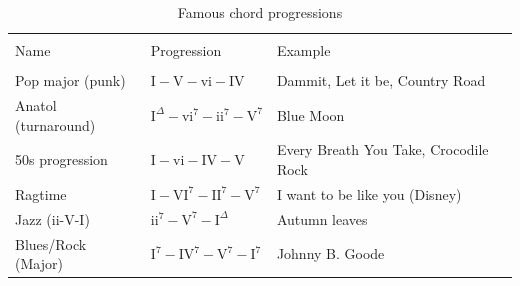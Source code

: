 \documentclass{article}
\begin{document}
\begin{table}[!h]
	\centering
	\caption{Famous chord progressions}
	\begin{adjustwidth}{-3cm}{}
	\begin{tabular}{p{5.0cm}p{5.5cm}p{7cm}}
		\hline \vspace{-0.2cm} \\
	    Name & Progression & Example\\
		\hline \vspace{-0.2cm} \\ 
		Pop major (punk)      & $\textrm{I}-\textrm{V}-\textrm{vi}-\textrm{IV}$ & Dammit, Let it be, Country Road \\
		Anatol (turnaround)   & $\textrm{I}^{\Delta}-\textrm{vi}^7-\textrm{ii}^7-\textrm{V}^7$ & Blue Moon \\
		50s progression       & $\textrm{I}-\textrm{vi}-\textrm{IV}-\textrm{V}$ & Every Breath You Take, Crocodile Rock\\
		Ragtime               &$\textrm{I}-\textrm{VI}^7-\textrm{II}^{7}-\textrm{V}^{7}$ & I want to be like you (Disney) \\
		Jazz (ii-V-I)         & $\textrm{ii}^{7}-\textrm{V}^7-\textrm{I}^{\Delta}$ & Autumn leaves\\
		Blues/Rock (Major)    & $\textrm{I}^7-\textrm{IV}^7-\textrm{V}^7-\textrm{I}^7$ & Johnny B. Goode\\
		

\end{tabular}
\end{adjustwidth}
\end{table}
\end{document}
